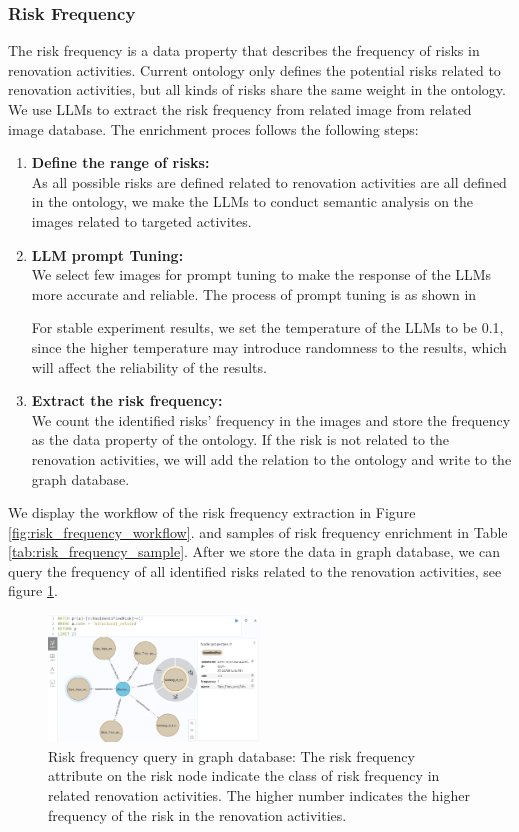 \subsubsection{Risk Frequency}
The risk frequency is a data property that describes the frequency of risks in renovation activities. 
Current ontology only defines the potential risks related to renovation activities, 
but all kinds of risks share the same weight in the ontology.
We use LLMs to extract the risk frequency from related image from related image database.
The enrichment proces follows the following steps:
\begin{enumerate}
    \item \textbf{Define the range of risks: } \\
    As all possible risks are defined related to renovation activities are all defined in the ontology, 
    we make the LLMs to conduct semantic analysis on the images related to targeted activites. 
    \item \textbf{LLM prompt Tuning: } \\
    We select few images for prompt tuning to make the response of the LLMs more accurate and reliable. 
    The process of prompt tuning is as shown in 


    For stable experiment results, we set the temperature of the LLMs to be 0.1,
     since the higher temperature may introduce randomness to the results, which will affect the reliability of the results.
    \item \textbf{Extract the risk frequency: } \\
    We count the identified risks' frequency in the images and store the frequency as the data property of the ontology.
    If the risk is not related to the renovation activities, we will add the relation to the ontology and write to the graph database.
\end{enumerate}

We display the workflow of the risk frequency extraction in Figure \ref{fig:risk_frequency_workflow}. and samples of risk frequency enrichment in Table \ref{tab:risk_frequency_sample}.
After we store the data in graph database, we can query the frequency of all identified risks related to the renovation activities, see figure \ref{fig:risk_frequency_query}.
\begin{figure}
    \label{fig:risk_frequency_query}
    \centering
    \includegraphics[width=0.5\textwidth]{figures/graph_frequency_query.png}
    \caption{Risk frequency query in graph database: The risk frequency attribute on the risk node indicate the class of risk frequency in related renovation activities.
     The higher number indicates the higher frequency of the risk in the renovation activities.}
\end{figure}

